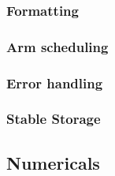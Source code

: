\documentclass[12pt]{article}
\begin{document}
		\subsubsection{Formatting}
		\subsubsection{Arm scheduling}
		\subsubsection{Error handling}
		\subsubsection{Stable Storage}
	\subsection{Numericals}
\end{document}
